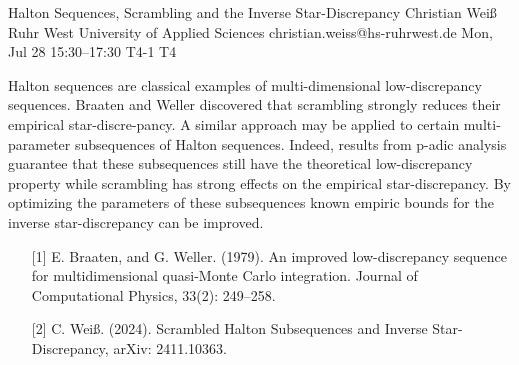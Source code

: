 \begin{talk}
  {Halton Sequences, Scrambling and the Inverse Star-Discrepancy}%
  {Christian Wei\ss{}}%
  {Ruhr West University of Applied Sciences}%
  {christian.weiss@hs-ruhrwest.de}%
  {}%
  {}%
  {Mon, Jul 28 15:30–17:30}%
  {T4-1}%
  {T4}%
  {}%
  
				
			
Halton sequences are classical examples of multi-dimensional low-discrepancy sequences. Braaten and Weller discovered that scrambling strongly reduces their empirical star-discre-pancy. A similar approach may be applied to certain multi-parameter subsequences of Halton sequences. Indeed, results from p-adic analysis guarantee that these subsequences still have the theoretical low-discrepancy property while scrambling has strong effects on the empirical star-discrepancy. By optimizing the parameters of these subsequences known empiric bounds for the inverse star-discrepancy can be improved.

\medskip


\begin{enumerate}
	\item[{[1]}] E. Braaten, and G. Weller. (1979). An improved low-discrepancy sequence for multidimensional quasi-Monte Carlo integration. Journal of Computational Physics, 33(2): 249–258.
	\item[{[2]}] C. Wei\ss{}. (2024). Scrambled Halton Subsequences and Inverse Star-Discrepancy, arXiv: 2411.10363. 
\end{enumerate}

\end{talk}

